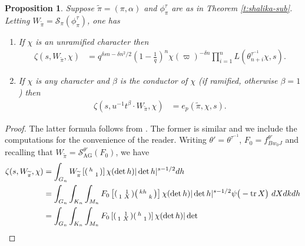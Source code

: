 \documentclass{amsart}
\newtheorem{proposition}[thm]{Proposition}
\theoremstyle{definition}
\newcommand{\tr}{\operatorname{tr}}
\newcommand{\AG}{\operatorname{AG}}
\newenvironment{spmatrix}{\left(\begin{smallmatrix}}{\end{smallmatrix}\right)}
\begin{document}
{\begin{proposition}\label{p:zeta-local-constants}
Suppose $\widetilde\pi=(\pi,\alpha)$ and $\phi_\pi^\tau$ are as in Theorem \ref{t:shalika-sub}. Letting 
$W_{\widetilde\pi}=\mathcal{S}_\pi(\phi_\pi^\tau)$, one has 
\begin{enumerate}
\item If $\chi$ is an unramified character then
\begin{align*}
\zeta(s,W_{\widetilde\pi},\chi)&=q^{\delta s n - \delta n^2/2}\left(1-\frac{1}{q}\right)^n\chi(\varpi)^{-\delta n}\prod_{i=1}^n L(\theta^{\tau^{-1}}_{n+i}\chi,s).
\end{align*}
\item If $\chi$ is any character and $\beta$ is the conductor of $\chi$ (if ramified, otherwise $\beta=1$) then
\begin{align*}
\zeta(s,u^{-1}t^\beta\cdot W_{\widetilde\pi}, \chi)&=e_p(\widetilde{\pi},\chi,s).
\end{align*}
\end{enumerate}
\end{proposition}
\begin{proof}
The latter formula follows from \cite[Prop. 9.3]{BDGJW}. The
former is similar and we include the computations for the convenience of the reader.
Writing $\theta'=\theta^{\tau^{-1}}$, $F_0=f_{Bw_0J}^{\theta'}$ and recalling that $W_{\widetilde\pi}=\mathcal{S}_{\AG}^{\theta'}(F_0)$, we have
	\begin{align*}
		\zeta(s,  W_{\widetilde\pi} , \chi)&=\int_{G_n}W_{\widetilde\pi}\left[\begin{spmatrix}
			h&\\&1\end{spmatrix}\right]\chi(\det h)|\det
		h|^{s-1/2}dh\\
		&=\int_{G_n}\int_{K_n}\int_{M_n}F_0\left[\begin{spmatrix}
			&1\\1&X\end{spmatrix}\begin{spmatrix}
			kh&\\&k\end{spmatrix}\right] \chi(\det h)|\det
		h|^{s-1/2}\psi\big(-\tr X\big)\ dXdkdh\\
		&=\int_{G_n}\int_{K_n}\int_{M_n}F_0\left[\begin{spmatrix}
			&1\\1&X\end{spmatrix}\begin{spmatrix}
			h&\\&1\end{spmatrix}\right] \chi(\det h)|\det

\end{align*}
\end{proof}}
\end{document}
